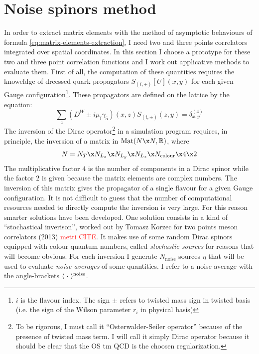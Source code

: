 \documentclass[english, LaM, oneside, noexaminfo]{sapthesis}
\newcommand{\colr}{\textcolor{red}}
\begin{document}
\section{Noise spinors method}
\noindent
In order to extract matrix elements with the method of asymptotic behaviours of formula \ref{eq:matrix-elements-extraction}, I need two and three points correlators integrated over spatial coordinates.
In this section I choose a prototype for these two and three point correlation functions and I work out applicative methods to evaluate them.
\newline
First of all, the computation of these quantities requires the knoweldge of dreessed quark propagators $S_{(i,\pm)}[U](x,y)$ for each given Gauge configuration\footnote{$i$ is the flavour index. The sign $\pm$ refers to twisted mass sign in twisted basis (i.e. the sign of the Wilson parameter $r_i$ in physical basis)}.
These propagators are defined on the lattice by the equation:
\begin{equation*}
    \sum_{z} \left(D^W\pm i\mu_i \gamma_5\right)(x,z) S_{(i,\pm)}(z,y) = \delta_{x,y}^{(4)}
\end{equation*}
The inversion of the Dirac operator\footnote{To be rigorous, I must call it ``Osterwalder-Seiler operator'' because of the presence of twisted mass term. I will call it simply Dirac operator because it should be clear that the OS tm QCD is the choosen regularization.}
in a simulation program requires, in principle, the inversion of a matrix in $\text{Mat}(N\x N,\mathbb{R})$, where
$$N = N_T \x N_{L_x} \x N_{L_y} \x N_{L_z} \x N_\text{colour} \x 4 \x 2 $$
The multiplicative factor $4$ is the number of components in a Dirac spinor while the factor $2$ is given because the matrix elements are complex numbers.
The inversion of this matrix gives the propagator of a single flavour for a given Gauge configuration.
It is not difficult to guess that the number of computational resources needed to directly compute the inversion is very large.
For this reason smarter solutions have been developed.
\newline
One solution consists in a kind of ``stochastical inverison'', worked out by Tomasz Korzec for two points meson correlators (2013) \colr{metti CITE}.
It makes use of some random Dirac spinors equipped with colour quantum numbers, called \textit{stochastic sources} for reasons that will become obvious.
For each inversion I generate $N_\text{noise}$ sources $\eta$ that will be used to evaluate \textit{noise averages} of some quantities.
I refer to a noise average with the angle-brackets $\langle\hspace{1mm}\cdot\hspace{1mm}\rangle^\text{noise}$. 
\end{document}
